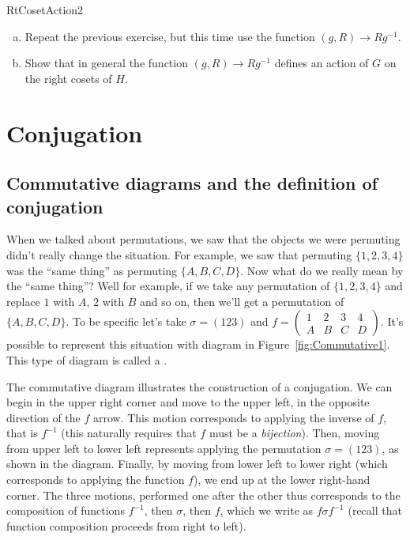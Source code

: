 \begin{exercise}{RtCosetAction2}
\begin{enumerate}[(a)]
\item Repeat the previous exercise, but this time use the function $(g,R)\rightarrow Rg^{-1}$.
\item Show that in general the function $(g,R)\rightarrow Rg^{-1}$ defines an action of $G$ on the right cosets of $H$.  
\end {enumerate}
\end {exercise}




\section{Conjugation}
\label{sec:GroupActions:Conjugation}

\subsection{Commutative diagrams and the definition of conjugation}
\label{subsec:GroupActions:Conjugation:DiagramAndDefinition}

When we talked about permutations, we saw that the objects we were permuting didn't really change the situation.  For example, we saw that permuting $\{1,2,3,4\}$ was the ``same thing'' as permuting $\{A,B,C,D\}$. Now what do we really mean by the ``same thing''? Well for example, if we take any permutation of $\{1,2,3,4\}$ and replace $1$ with $A$, $2$ with $B$ and so on, then we'll get a permutation of $\{A,B,C,D\}$. To be specific let's take $\sigma=(123)$ and $f=\begin{pmatrix} 1&2&3&4\\A&B&C&D\end {pmatrix}$.  It's possible to represent this situation with diagram in Figure~\ref{fig:Commutative1}. This type of diagram is called a .


The commutative diagram illustrates the construction of a conjugation. We can begin in the upper right corner and move to the upper left, in the opposite direction of the $f$ arrow. This motion corresponds to
applying the inverse of $f$, that is 
 $f^{-1}$ (this naturally requires that $f$ must be a \emph{bijection}).  Then, moving from upper left to lower left represents applying the permutation $\sigma=(123)$, as shown in the diagram.  Finally, by moving from lower left to lower right (which corresponds to 
applying the function $f$), we end up at the lower right-hand corner. The three motions, performed one after the other thus corresponds to the composition of functions $f^{-1}$, then $\sigma$, then $f$, which we write as
$f \sigma f^{-1}$ (recall that function composition proceeds from right to left). 

